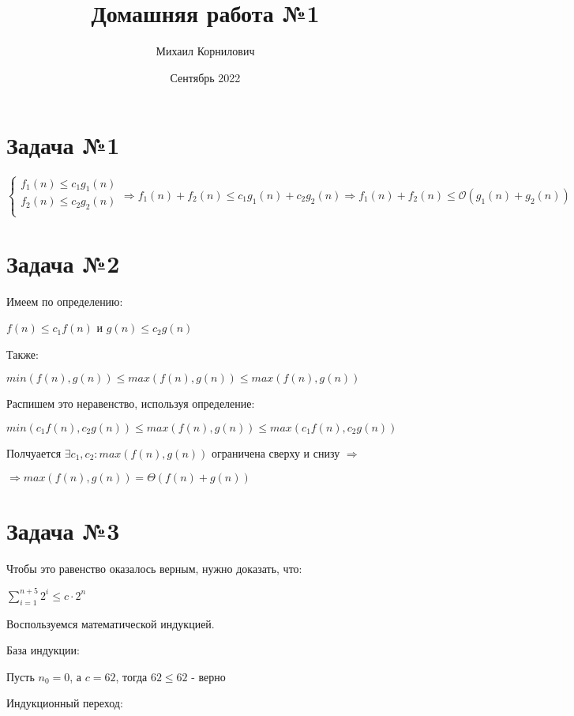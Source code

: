 \documentclass{article}
\title{Домашняя работа №1}
\author{Михаил Корнилович}
\date{Сентябрь 2022}
\begin{document}
\maketitle
\newpage
{}
\section{Задача №1}

\begin{equation*}
    \begin{cases}
        f_1(n) \leq c_1g_1(n) \\
        f_2(n) \leq c_2g_2(n) \\
    \end{cases}
    \Rightarrow
    f_1(n) + f_2(n) \leq c_1g_1(n) + c_2g_2(n)
    \Rightarrow
    f_1(n) + f_2(n) \leq \mathcal{O}(g_1(n) + g_2(n))
\end{equation*}

\section{Задача №2}

Имеем по определению:

$f(n) \leq c_1f(n)$ и $g(n) \leq c_2g(n)$

\noindent Также:

$min(f(n), g(n)) \leq max(f(n), g(n)) \leq max(f(n), g(n))$

\noindent Распишем это неравенство, используя определение:

$min(c_1f(n), c_2g(n)) \leq max(f(n), g(n)) \leq max(c_1f(n), c_2g(n))$

\noindent Полчуается  $\exists c_1,c_2: max(f(n), g(n))$ ограничена сверху и снизу $\Rightarrow$

$\Rightarrow max(f(n), g(n)) = \Theta(f(n) + g(n))$

\section{Задача №3}
\noindent Чтобы это равенство оказалось верным, нужно доказать, что:

$\sum_{i=1}^{n+5} 2^i \leq c\cdot2^n$
 
\noindent Воспользуемся математической индукцией.

\noindent База индукции:

Пусть $n_0 = 0$, а $c = 62$, тогда $62 \leq 62$ - верно

\noindent Индукционный переход:
\end{document}
